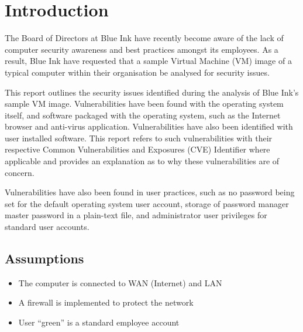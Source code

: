 \section{Introduction}

The Board of Directors at Blue Ink have recently become aware of the lack of computer security awareness and best practices amongst its employees. As a result, Blue Ink have requested that a sample Virtual Machine (VM) image of a typical computer within their organisation be analysed for security issues.

This report outlines the security issues identified during the analysis of Blue Ink's sample VM image. Vulnerabilities have been found with the operating system itself, and software packaged with the operating system, such as the Internet browser and anti-virus application. Vulnerabilities have also been identified with user installed software. This report refers to such vulnerabilities with their respective Common Vulnerabilities and Exposures (CVE) Identifier \citep{MITRE2015} where applicable and provides an explanation as to why these vulnerabilities are of concern.

Vulnerabilities have also been found in user practices, such as no password being set for the default operating system user account, storage of password manager master password in a plain-text file, and administrator user privileges for standard user accounts.


\subsection{Assumptions}

\begin{itemize}
\item The computer is connected to WAN (Internet) and LAN
\item A firewall is implemented to protect the network
\item User ``green'' is a standard employee account
\end{itemize}
